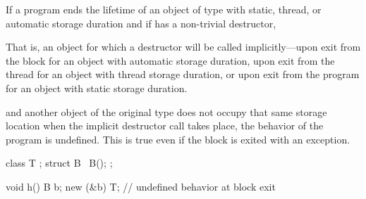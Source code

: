 \pnum
If a program ends the lifetime of an object of type  with
static, thread,
or automatic
storage duration and if  has a non-trivial destructor,
\begin{footnote}
That
is, an object for which a destructor will be called
implicitly---upon exit from the block for an object with
automatic storage duration, upon exit from the thread for an object with
thread storage duration, or upon exit from the program for an object
with static storage duration.
\end{footnote}
and another object of the original type does not occupy
that same storage location when the implicit destructor call takes
place, the behavior of the program is undefined. This is true
%
%
%
%
%
even if the block is exited with an exception.
\begin{example}
\begin{codeblock}
class T { };
struct B {
  ~B();
};

void h() {
  B b;
  new (&b) T;
}                               // undefined behavior at block exit
\end{codeblock}
\end{example}

